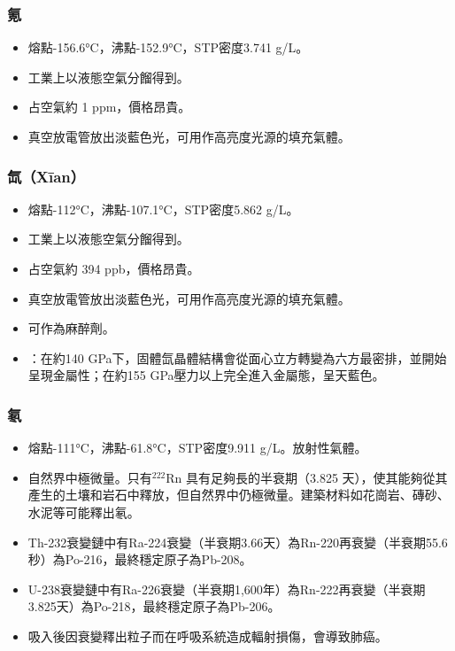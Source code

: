 \documentclass[a4paper,12pt]{report}
\begin{document}
\begin{itemize}
\begin{itemize}
\subsubsection{氪}
\begin{itemize}
\item 熔點-156.6°C，沸點-152.9°C，STP密度3.741 g/L。
\item 工業上以液態空氣分餾得到。
\item 占空氣約 1 ppm，價格昂貴。
\item 真空放電管放出淡藍色光，可用作高亮度光源的填充氣體。
\end{itemize}
\subsubsection{氙（Xīan）}
\begin{itemize}
\item 熔點-112°C，沸點-107.1°C，STP密度5.862 g/L。
\item 工業上以液態空氣分餾得到。
\item 占空氣約 394 ppb，價格昂貴。
\item 真空放電管放出淡藍色光，可用作高亮度光源的填充氣體。
\item 可作為麻醉劑。
\item {}：在約140 GPa下，固體氙晶體結構會從面心立方轉變為六方最密排，並開始呈現金屬性；在約155 GPa壓力以上完全進入金屬態，呈天藍色。
\end{itemize}
\subsubsection{氡}
\begin{itemize}
\item 熔點-111°C，沸點-61.8°C，STP密度9.911 g/L。放射性氣體。
\item 自然界中極微量。只有$^{222}$Rn 具有足夠長的半衰期（3.825 天），使其能夠從其產生的土壤和岩石中釋放，但自然界中仍極微量。建築材料如花崗岩、磚砂、水泥等可能釋出氡。
\item Th-232衰變鏈中有Ra-224\text{\textalpha}衰變（半衰期3.66天）為Rn-220再\text{\textalpha}衰變（半衰期55.6秒）為Po-216，最終穩定原子為Pb-208。
\item U-238衰變鏈中有Ra-226\text{\textalpha}衰變（半衰期1,600年）為Rn-222再\text{\textalpha}衰變（半衰期3.825天）為Po-218，最終穩定原子為Pb-206。
\item 吸入後因\text{\textalpha}衰變釋出\text{\textalpha}粒子而在呼吸系統造成輻射損傷，會導致肺癌。
\end{itemize}

\end{itemize}
\end{itemize}
\end{document}
